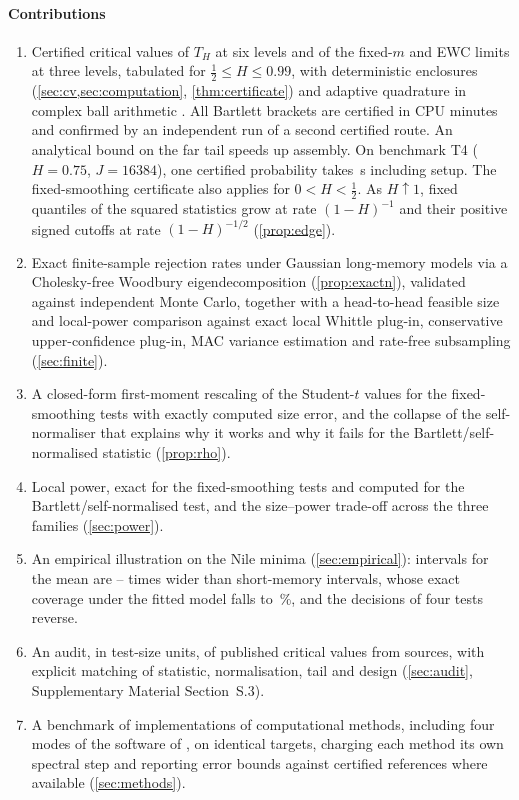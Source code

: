 \paragraph{Contributions}
\begin{enumerate}
\item[(C1)] Certified critical values of $T_H$ at six levels and of the fixed-$m$ and EWC limits at three levels, tabulated
for $\frac12\le H\le0.99$, with deterministic enclosures (\cref{sec:cv,sec:computation}, \cref{thm:certificate}) and adaptive
quadrature in complex ball arithmetic \citep{Joh18}. All  Bartlett brackets are certified in
 CPU minutes and confirmed by an independent run of a second certified route. An analytical bound on
the far tail speeds up assembly.
On benchmark T4 ($H=0.75$, $J=16384$), one certified probability takes \,s including setup.
The fixed-smoothing certificate also applies for $0<H<\frac12$. As $H\uparrow1$, fixed quantiles of the squared
statistics grow at rate $(1-H)^{-1}$ and their positive signed cutoffs at rate $(1-H)^{-1/2}$ (\cref{prop:edge}).
\item[(C2)] Exact finite-sample rejection rates under Gaussian long-memory models via a Cholesky-free Woodbury
eigendecomposition (\cref{prop:exactn}), validated against independent Monte Carlo, together with a head-to-head
feasible size and local-power comparison against exact local Whittle plug-in, conservative upper-confidence plug-in,
MAC variance estimation \citep{ADG09} and rate-free subsampling \citep{PRW99} (\cref{sec:finite}).
\item[(C3)] A closed-form first-moment rescaling of the Student-$t$ values for the fixed-smoothing tests with exactly
computed size error, and the collapse of the self-normaliser that explains why it works and why it fails for the
Bartlett/self-normalised statistic (\cref{prop:rho}).
\item[(C4)] Local power, exact for the fixed-smoothing tests and computed for the Bartlett/self-normalised test, and the
size--power trade-off across the three families (\cref{sec:power}).
\item[(C5)] An empirical illustration on the Nile minima (\cref{sec:empirical}): \CosCert{} intervals for the mean are
-- times wider than short-memory intervals, whose exact coverage under the fitted
model falls to \,\%, and the decisions of four tests reverse.
\item[(C6)] An audit, in test-size units, of  published critical values from
 sources, with explicit matching of statistic, normalisation, tail and design
(\cref{sec:audit}, Supplementary Material Section~S.3).
\item[(C7)] A benchmark of  implementations of  computational methods, including
four modes of the software of \citet{Das25}, on identical targets, charging each method its own spectral step and
reporting error bounds against certified references where available (\cref{sec:methods}).
\end{enumerate}

